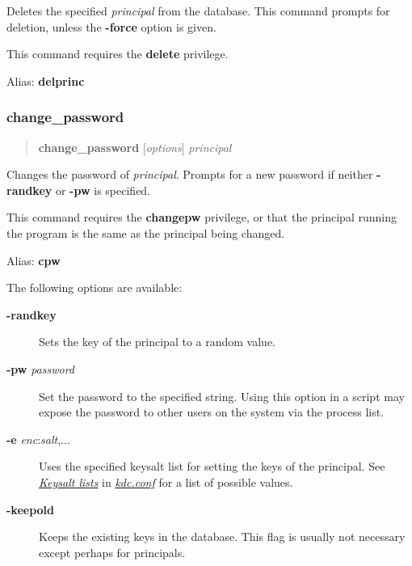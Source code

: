 \documentclass[letterpaper,10pt,english]{sphinxmanual}
\begin{document}
Deletes the specified \emph{principal} from the database.  This command
prompts for deletion, unless the \textbf{-force} option is given.

This command requires the \textbf{delete} privilege.

Alias: \textbf{delprinc}
\label{admin/admin_commands/kadmin_local:delete-principal-end}

\subsubsection{change\_password}
\label{admin/admin_commands/kadmin_local:id5}\label{admin/admin_commands/kadmin_local:delete-principal-end}\label{admin/admin_commands/kadmin_local:change-password}\begin{quote}

\textbf{change\_password} {[}\emph{options}{]} \emph{principal}
\end{quote}

Changes the password of \emph{principal}.  Prompts for a new password if
neither \textbf{-randkey} or \textbf{-pw} is specified.

This command requires the \textbf{changepw} privilege, or that the
principal running the program is the same as the principal being
changed.

Alias: \textbf{cpw}

The following options are available:
\begin{description}
\item[{\textbf{-randkey}}] \leavevmode
Sets the key of the principal to a random value.

\item[{\textbf{-pw} \emph{password}}] \leavevmode
Set the password to the specified string.  Using this option in a
script may expose the password to other users on the system via
the process list.

\item[{\textbf{-e} \emph{enc}:\emph{salt},...}] \leavevmode
Uses the specified keysalt list for setting the keys of the
principal.  See {\hyperref[admin/conf_files/kdc_conf:keysalt-lists]{\emph{Keysalt lists}}} in {\hyperref[admin/conf_files/kdc_conf:kdc-conf-5]{\emph{kdc.conf}}} for a
list of possible values.

\item[{\textbf{-keepold}}] \leavevmode
Keeps the existing keys in the database.  This flag is usually not
necessary except perhaps for  principals.

\end{description}
\end{document}
